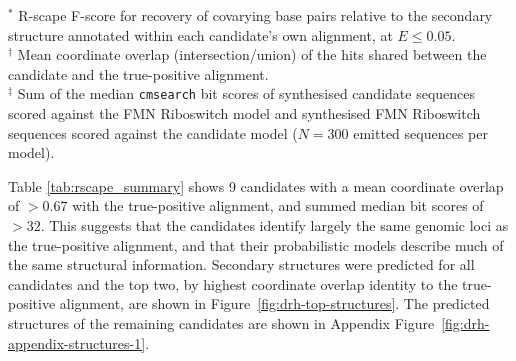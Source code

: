 \begin{table}[H]
\centering
\footnotesize
\caption[FMN riboswitch rediscovery candidates]{\textbf{FMN riboswitch rediscovery candidates.}
    A summary of the candidate strucutred elements identified by the discovery and iterative expansion pipelines, and their covariation analysis results.
    Candidates are compared to a true-positive alignment and model to assess their recovery of the known \ac{FMN} riboswitch signal.}
\label{tab:rscape_summary}


\vspace{4pt}
\begin{minipage}{\textwidth}
\raggedright
$^{*}$ R-scape F-score for recovery of covarying base pairs relative to the secondary structure annotated within each candidate's own alignment, at $E \le 0.05$.\\
$^{\dagger}$ Mean coordinate overlap (intersection/union) of the hits shared between the candidate and the true-positive alignment.\\
$^{\ddagger}$ Sum of the median \texttt{cmsearch} bit scores of synthesised candidate sequences scored against the \ac{FMN} Riboswitch model and synthesised \ac{FMN} Riboswitch sequences scored against the candidate model ($N = 300$ emitted sequences per model).
\end{minipage}
\end{table}

Table \ref{tab:rscape_summary} shows 9 candidates with a mean coordinate overlap of $>0.67$ with the true-positive alignment, and summed median bit scores of $>32$.
This suggests that the candidates identify largely the same genomic loci as the true-positive alignment, and that their probabilistic models describe much of the same structural information.
Secondary structures were predicted for all candidates and the top two, by highest coordinate overlap identity to the true-positive alignment, are shown in Figure~\ref{fig:drh-top-structures}.
The predicted structures of the remaining candidates are shown in Appendix Figure~\ref{fig:drh-appendix-structures-1}.

